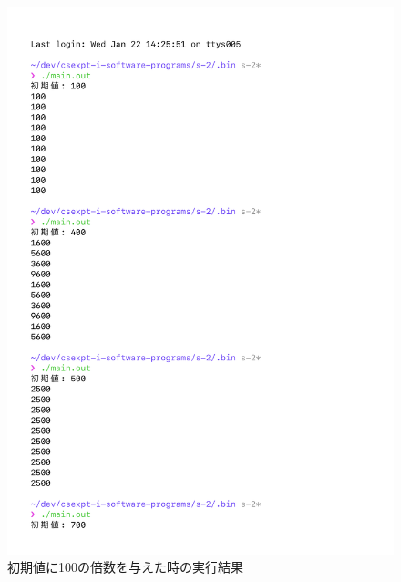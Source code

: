 \begin{figure}[H]
    \ContinuedFloat
    \centering
    \includegraphics[width=0.8\hsize, pagebox=mediabox, page=2]{main_result2.pdf}
    \caption{初期値に100の倍数を与えた時の実行結果}
    \label{初期値に100の倍数を与えた時の実行結果}
\end{figure}
